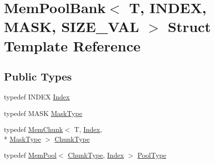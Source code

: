 \hypertarget{structMemPoolBank}{\section{Mem\-Pool\-Bank$<$ T, I\-N\-D\-E\-X, M\-A\-S\-K, S\-I\-Z\-E\-\_\-\-V\-A\-L $>$ Struct Template Reference}
\label{structMemPoolBank}
}
\subsection*{Public Types}
\begin{DoxyCompactItemize}
\item 
typedef I\-N\-D\-E\-X \hyperlink{structMemPoolBank_a5f3e0490f2f4fe5dbf321cc00eb35007}{Index}
\item 
typedef M\-A\-S\-K \hyperlink{structMemPoolBank_a35d618e084e7be124feef368925d46d5}{Mask\-Type}
\item 
typedef \hyperlink{structMemChunk}{Mem\-Chunk}$<$ T, \hyperlink{structMemPoolBank_a5f3e0490f2f4fe5dbf321cc00eb35007}{Index}, \\*
\hyperlink{structMemPoolBank_a35d618e084e7be124feef368925d46d5}{Mask\-Type} $>$ \hyperlink{structMemPoolBank_a5fa9a36b46ad0ecb5dbbfa0bd105dcb6}{Chunk\-Type}
\item 
typedef \hyperlink{structMemPool}{Mem\-Pool}$<$ \hyperlink{structMemPoolBank_a5fa9a36b46ad0ecb5dbbfa0bd105dcb6}{Chunk\-Type}, \hyperlink{structMemPoolBank_a5f3e0490f2f4fe5dbf321cc00eb35007}{Index} $>$ \hyperlink{structMemPoolBank_afae3596e9bd9f9245bc55fbe47356e96}{Pool\-Type}
\end{DoxyCompactItemize}
